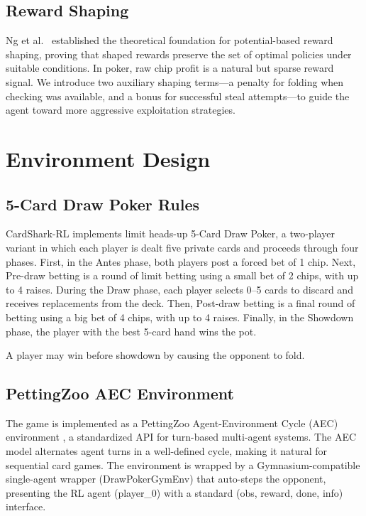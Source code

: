 \documentclass[conference]{IEEEtran}
\begin{document}
\subsection{Reward Shaping}

Ng et al.~\cite{ng1999policy} established the theoretical foundation
for potential-based reward shaping, proving that shaped rewards
preserve the set of optimal policies under suitable conditions. In
poker, raw chip profit is a natural but sparse reward signal. We
introduce two auxiliary shaping terms---a penalty for folding when
checking was available, and a bonus for successful steal attempts---to
guide the agent toward more aggressive exploitation strategies.

\section{Environment Design}
\label{sec:env}

\subsection{5-Card Draw Poker Rules}

CardShark-RL implements limit heads-up 5-Card Draw Poker, a
two-player variant in which each player is dealt five private cards
and proceeds through four phases. First, in the Antes phase, both players post a forced bet of 1 chip. Next, Pre-draw betting is a round of limit betting using a small bet of 2 chips, with up to 4 raises. During the Draw phase, each player selects 0--5 cards to discard and receives replacements from the deck. Then, Post-draw betting is a final round of betting using a big bet of 4 chips, with up to 4 raises. Finally, in the Showdown phase, the player with the best 5-card hand wins the pot.

A player may win before showdown by causing the opponent to fold.

\subsection{PettingZoo AEC Environment}

The game is implemented as a PettingZoo Agent-Environment Cycle (AEC)
environment \cite{terry2021pettingzoo}, a standardized API for
turn-based multi-agent systems. The AEC model alternates agent turns
in a well-defined cycle, making it natural for sequential card games.
The environment is wrapped by a Gymnasium-compatible
\cite{brockman2016openai} single-agent wrapper (DrawPokerGymEnv)
that auto-steps the opponent, presenting the RL agent
(player\_0) with a standard (obs, reward, done,
info) interface.
\end{document}
